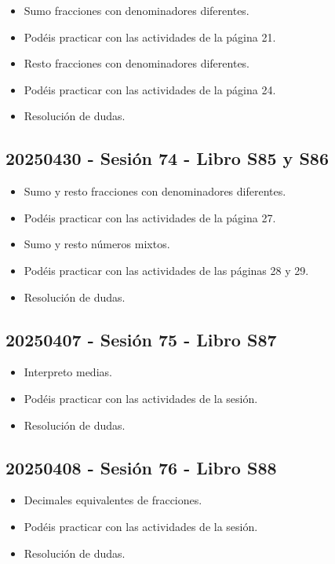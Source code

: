 \documentclass[a4paper,12pt]{article}
\begin{document}
\begin{itemize}
    \item Sumo fracciones con denominadores diferentes.
    \item Podéis practicar con las actividades de la página 21.
    \item Resto fracciones con denominadores diferentes.
    \item Podéis practicar con las actividades de la página 24.
    \item Resolución de dudas.
\end{itemize}

\subsection{20250430 - Sesión 74 - Libro S85 y S86}

\begin{itemize}
    \item Sumo y resto fracciones con denominadores diferentes.
    \item Podéis practicar con las actividades de la página 27.
    \item Sumo y resto números mixtos.
    \item Podéis practicar con las actividades de las páginas 28 y 29.
    \item Resolución de dudas. 
\end{itemize}

\subsection{20250407 - Sesión 75 - Libro S87}

\begin{itemize}
    \item Interpreto medias.
    \item Podéis practicar con las actividades de la sesión.
    \item Resolución de dudas.
\end{itemize}

\subsection{20250408 - Sesión 76 - Libro S88}

\begin{itemize}
    \item Decimales equivalentes de fracciones.
    \item Podéis practicar con las actividades de la sesión.
    \item Resolución de dudas.
\end{itemize}
\end{document}

